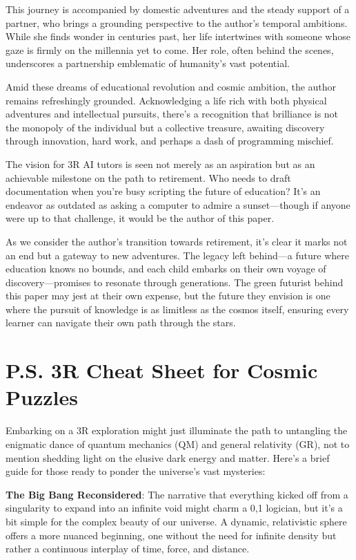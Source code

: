 \documentclass[12pt]{article}
\begin{document}
This journey is accompanied by domestic adventures and the steady support of a partner, who brings a grounding perspective to the author's temporal ambitions. While she finds wonder in centuries past, her life intertwines with someone whose gaze is firmly on the millennia yet to come. Her role, often behind the scenes, underscores a partnership emblematic of humanity’s vast potential.

Amid these dreams of educational revolution and cosmic ambition, the author remains refreshingly grounded. Acknowledging a life rich with both physical adventures and intellectual pursuits, there's a recognition that brilliance is not the monopoly of the individual but a collective treasure, awaiting discovery through innovation, hard work, and perhaps a dash of programming mischief.

The vision for 3R AI tutors is seen not merely as an aspiration but as an achievable milestone on the path to retirement. Who needs to draft documentation when you’re busy scripting the future of education? It’s an endeavor as outdated as asking a computer to admire a sunset—though if anyone were up to that challenge, it would be the author of this paper.

As we consider the author’s transition towards retirement, it's clear it marks not an end but a gateway to new adventures. The legacy left behind—a future where education knows no bounds, and each child embarks on their own voyage of discovery—promises to resonate through generations. The green futurist behind this paper may jest at their own expense, but the future they envision is one where the pursuit of knowledge is as limitless as the cosmos itself, ensuring every learner can navigate their own path through the stars.

\section*{P.S. 3R Cheat Sheet for Cosmic Puzzles}

Embarking on a 3R exploration might just illuminate the path to untangling the enigmatic dance of quantum mechanics (QM) and general relativity (GR), not to mention shedding light on the elusive dark energy and matter. Here's a brief guide for those ready to ponder the universe's vast mysteries:

\textbf{The Big Bang Reconsidered}: The narrative that everything kicked off from a singularity to expand into an infinite void might charm a {0,1} logician, but it's a bit simple for the complex beauty of our universe. A dynamic, relativistic sphere offers a more nuanced beginning, one without the need for infinite density but rather a continuous interplay of time, force, and distance.
\end{document}
